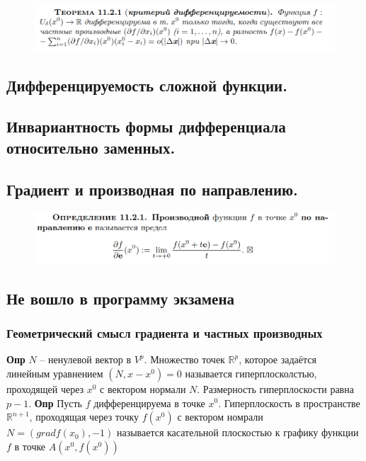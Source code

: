 \documentclass{article}
\newcommand{\R}{\mathbb{R}}
\newcommand{\bb}{\textbf}
\begin{document}
\begin{figure}[h!]
    \centering
    \includegraphics[width=\textwidth]{39.png}
    \vspace{-1cm}
\end{figure}

\newpage
\subsection{Дифференцируемость сложной функции.}

\newpage
\subsection{Инвариантность формы дифференциала относительно заменных.}

\newpage
\subsection{Градиент и производная по направлению.}
\begin{figure}[h!]
    \centering
    \includegraphics[width=\textwidth]{51.png}
    \vspace{-1cm}
\end{figure}

\newpage
\subsection{Не вошло в программу экзамена}
\subsubsection{Геометрический смысл градиента и частных производных}
\bb{Опр} $N$ -- ненулевой вектор в $V^p$. Множество точек $\R^p$, которое задаётся линейным уравнением $(N, x-x^0) = 0$ называется гиперплосколстью, проходящей через $x^0$ с вектором нормали $N$. Размерность гиперплоскости равна $p-1$.
\bb{Опр} Пусть $f$ дифференцируема в точке $x^0$. Гиперплоскость в пространстве $\R^{n+1}$, проходящая через точку $f(x^0)$ с вектором номрали $N = (gradf(x_0), - 1)$ называется касательной плоскостью к графику функции $f$ в точке $A(x^0, f(x^0))$
\end{document}
